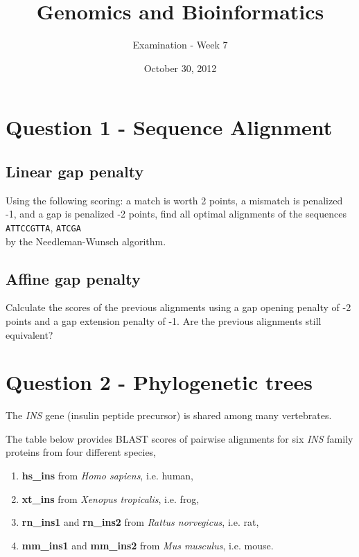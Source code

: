 \documentclass[a4paper,11pt]{article}
\title{Genomics and Bioinformatics}
\date{October 30, 2012}
\author{Examination - Week 7}
\begin{document}
\maketitle

\section*{Question 1 - Sequence Alignment}

\subsection*{Linear gap penalty}
Using the following scoring: a match is worth 2 points, a mismatch is penalized -1,
and a gap is penalized -2 points, find all optimal 
alignments of the sequences\\
\texttt{ATTCCGTTA}, \texttt{ATCGA}\\
by the Needleman-Wunsch algorithm.  


\subsection*{Affine gap penalty}

Calculate the scores of the previous alignments using a gap opening
penalty of -2 points and a gap extension penalty of -1. 
Are the previous alignments still equivalent?

\section*{Question 2 - Phylogenetic trees}

The \textit{INS} gene (insulin peptide precursor) is shared among many vertebrates.

The table below provides BLAST scores of pairwise
alignments for six \textit{INS} family proteins from four different species, 

\begin{enumerate}
\item {\bf hs\_ins} from {\it Homo sapiens}, i.e. human,
\item {\bf xt\_ins} from {\it Xenopus tropicalis}, i.e. frog,
\item {\bf rn\_ins1} and {\bf rn\_ins2} from {\it Rattus norvegicus}, i.e. rat,
\item {\bf mm\_ins1} and  {\bf mm\_ins2} from {\it Mus musculus}, i.e. mouse.
\end{enumerate}
\end{document}
